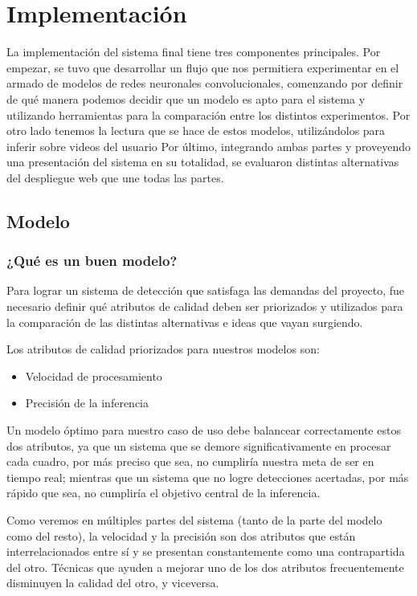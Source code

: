 \documentclass[a4paper]{article}
\begin{document}
\section{Implementación}

La implementación del sistema final tiene tres componentes principales. Por empezar, se tuvo que desarrollar un flujo que nos permitiera experimentar en el armado de modelos de redes neuronales convolucionales, comenzando por definir de qué manera podemos decidir que un modelo es apto para el sistema y utilizando herramientas para la comparación entre los distintos experimentos. Por otro lado tenemos la lectura que se hace de estos modelos, utilizándolos para inferir sobre videos del usuario Por último, integrando ambas partes y proveyendo una presentación del sistema en su totalidad, se evaluaron distintas alternativas del despliegue web que une todas las partes.

\subsection{Modelo}

\subsubsection{¿Qué es un buen modelo?}

Para lograr un sistema de detección que satisfaga las demandas del proyecto, fue necesario definir qué atributos de calidad deben ser priorizados y utilizados para la comparación de las distintas alternativas e ideas que vayan surgiendo.\medskip

Los atributos de calidad priorizados para nuestros modelos son:

\begin{itemize}
\itemsep0em
    \item Velocidad de procesamiento
    \item Precisión de la inferencia
\end{itemize}

Un modelo óptimo para nuestro caso de uso debe balancear correctamente estos dos atributos, ya que un sistema que se demore significativamente en procesar cada cuadro, por más preciso que sea, no cumpliría nuestra meta de ser en tiempo real; mientras que un sistema que no logre detecciones acertadas, por más rápido que sea, no cumpliría el objetivo central de la inferencia.

Como veremos en múltiples partes del sistema (tanto de la parte del modelo como del resto), la velocidad y la precisión son dos atributos que están interrelacionados entre sí y se presentan constantemente como una contrapartida del otro. Técnicas que ayuden a mejorar uno de los dos atributos frecuentemente disminuyen la calidad del otro, y viceversa.
\end{document}
